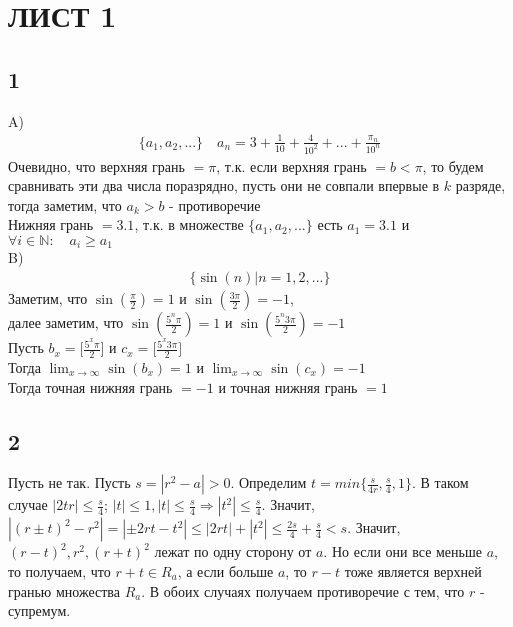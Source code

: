 	\section{ЛИСТ 1}
		\subsection{1}
		A)\\
		\begin{gather*}
			\{ a_1, a_2, ... \} \quad a_n = 3 + \frac{1}{10} + \frac{4}{10^2} + ... + \frac{\pi_n}{10^n}
		\end{gather*}
		Очевидно, что верхняя грань $= \pi$, т.к. если верхняя грань $= b < \pi$, то будем сравнивать эти два числа поразрядно, пусть они не совпали впервые в $k$ разряде, тогда заметим, что $a_k > b$ - противоречие\\
		Нижняя грань $= 3.1$, т.к. в множестве $\{ a_1, a_2, ... \}$ есть $a_1 = 3.1$ и $\forall i\in \mathbb{N}: \quad a_i \geq a_1$
		\\
		B)\\
		\begin{gather*}
			\{ \sin(n) | n = 1, 2, ... \}
		\end{gather*}
		Заметим, что $\sin(\frac{\pi}{2}) = 1$ и $\sin(\frac{3\pi}{2}) = -1$, \\
		далее заметим, что $\sin(\frac{5^n \pi}{2}) = 1$ и $\sin(\frac{5^n 3\pi}{2}) = -1$\\ 
		Пусть $b_x = \biggl[\frac{5^x \pi}{2}\biggl]$ и $c_x = \biggl[\frac{5^x 3\pi}{2}\biggl]$\\
		Тогда $\lim_{x\to\infty} \sin(b_x) = 1$ и $\lim_{x\to\infty} \sin(c_x) = -1$\\
		Тогда точная нижняя грань $= -1$ и точная нижняя грань $= 1$
		
		\subsection{2}
		Пусть не так. Пусть $s = |r^2 - a| > 0$. Определим $t = min \{ \frac{s}{4r}, \frac{s}{4}, 1 \}$. В таком случае $|2tr| \leqslant \frac{s}{4}$; $|t| \leqslant 1, |t| \leqslant \frac{s}{4} \Rightarrow |t^2| \leqslant \frac{s}{4}$. Значит, $|(r \pm t)^2 - r^2| = |\pm 2rt - t^2| \leqslant |2rt| + |t^2| \leqslant \frac{2s}{4} + \frac{s}{4} < s$. Значит, $(r-t)^2, r^2, (r+t)^2$ лежат по одну сторону от $a$. Но если они все меньше $a$, то получаем, что $r+t \in R_a$, а если больше $a$, то $r-t$ тоже является верхней гранью множества $R_a$. В обоих случаях получаем противоречие с тем, что $r$ - супремум.
		
